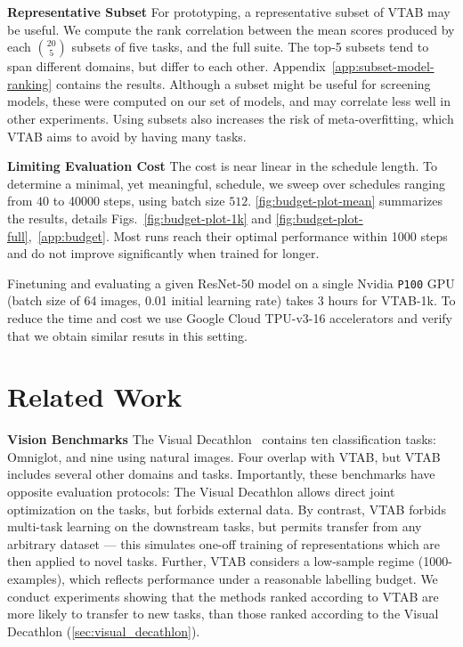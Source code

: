 \textbf{Representative Subset}\quad
For prototyping, a representative subset of VTAB may be useful. We compute the rank correlation between the mean scores produced by each $\binom{20}{5}$  subsets of five tasks, and the full suite. The top-5 subsets tend to span different domains, but differ to each other.
Appendix~\ref{app:subset-model-ranking} contains the results. Although a subset might be useful for screening models, these were computed on our set of models, and may correlate less well in other experiments. Using subsets also increases the risk of meta-overfitting, which VTAB aims to avoid by having many tasks.

\textbf{Limiting Evaluation Cost}\quad
The cost is near linear in the schedule length. To determine a minimal, yet meaningful, schedule, we sweep over schedules ranging from $40$ to \num{40000} steps, using batch size $512$.
\ref{fig:budget-plot-mean} summarizes the results, details Figs.~\ref{fig:budget-plot-1k} and \ref{fig:budget-plot-full},~\ref{app:budget}.
Most runs reach their optimal performance within \num{1000} steps and do not improve significantly when trained for longer.

Finetuning and evaluating a given ResNet-50 model on a single Nvidia \texttt{P100} GPU (batch size of 64 images, 0.01 initial learning rate) takes 3 hours for VTAB-1k. To reduce the time and cost we use Google Cloud TPU-v3-16 accelerators and verify that we obtain similar resuts in this setting.

\section{Related Work \label{sec:related_work}}

\textbf{Vision Benchmarks}\quad
The Visual Decathlon~\citep{rebuffi2017} contains ten classification tasks: Omniglot, and nine using natural images. Four overlap with VTAB, but VTAB includes several other domains and tasks. Importantly, these benchmarks have opposite evaluation protocols: The Visual Decathlon allows direct joint optimization on the tasks, but forbids external data. By contrast, VTAB forbids multi-task learning on the downstream tasks, but permits transfer from any arbitrary dataset --- this simulates one-off training of representations which are then applied to novel tasks. Further, VTAB considers a low-sample regime (1000-examples), which reflects performance under a reasonable labelling budget. We conduct experiments showing that the methods ranked according to  VTAB are more likely to transfer to new tasks, than those ranked according to the Visual Decathlon (\ref{sec:visual_decathlon}).

